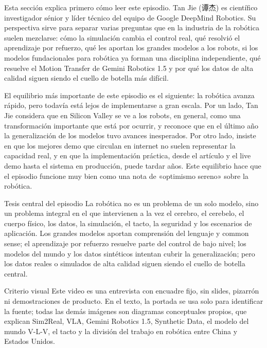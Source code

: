 \documentclass[a4paper]{article}
\begin{document}
Esta sección explica primero cómo leer este episodio. Tan Jie (谭杰) es científico investigador sénior y líder técnico del equipo de Google DeepMind Robotics. Su perspectiva sirve para separar varias preguntas que en la industria de la robótica suelen mezclarse: cómo la simulación cambia el control real, qué resolvió el aprendizaje por refuerzo, qué les aportan los grandes modelos a los robots, si los modelos fundacionales para robótica ya forman una disciplina independiente, qué resuelve el Motion Transfer de Gemini Robotics 1.5 y por qué los datos de alta calidad siguen siendo el cuello de botella más difícil.

El equilibrio más importante de este episodio es el siguiente: la robótica avanza rápido, pero todavía está lejos de implementarse a gran escala. Por un lado, Tan Jie considera que en Silicon Valley se ve a los robots, en general, como una transformación importante que está por ocurrir, y reconoce que en el último año la generalización de los modelos tuvo avances inesperados. Por otro lado, insiste en que los mejores demo que circulan en internet no suelen representar la capacidad real, y en que la implementación práctica, desde el artículo y el live demo hasta el sistema en producción, puede tardar años. Este equilibrio hace que el episodio funcione muy bien como una nota de «optimismo sereno» sobre la robótica.

\begin{importantbox}{Tesis central del episodio}
La robótica no es un problema de un solo modelo, sino un problema integral en el que intervienen a la vez el cerebro, el cerebelo, el cuerpo físico, los datos, la simulación, el tacto, la seguridad y los escenarios de aplicación. Los grandes modelos aportan comprensión del lenguaje y common sense; el aprendizaje por refuerzo resuelve parte del control de bajo nivel; los modelos del mundo y los datos sintéticos intentan cubrir la generalización; pero los datos reales o simulados de alta calidad siguen siendo el cuello de botella central.
\end{importantbox}

\begin{knowledgebox}{Criterio visual}
Este video es una entrevista con encuadre fijo, sin slides, pizarrón ni demostraciones de producto. En el texto, la portada se usa solo para identificar la fuente; todas las demás imágenes son diagramas conceptuales propios, que explican Sim2Real, VLA, Gemini Robotics 1.5, Synthetic Data, el modelo del mundo V-L-V, el tacto y la división del trabajo en robótica entre China y Estados Unidos.
\end{knowledgebox}
\end{document}
